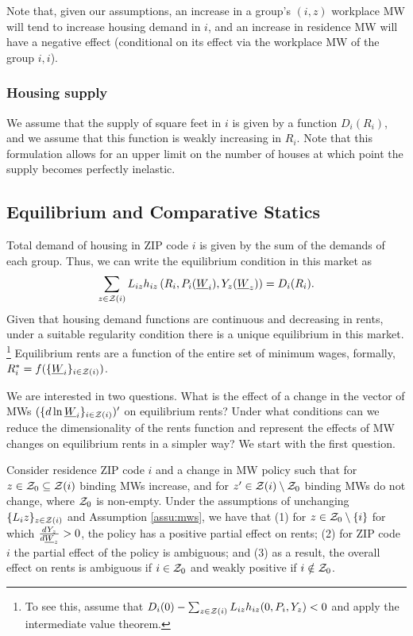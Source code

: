 Note that, given our assumptions, an increase in a group's $(i,z)$ workplace MW 
will tend to increase housing demand in $i$, and an increase in residence MW
will have a negative effect (conditional on its effect via the workplace MW
of the group $i,i$).


\subsubsection*{Housing supply}

We assume that the supply of square feet in $i$ is given by a function $D_i(R_i)$,
and we assume that this function is weakly increasing in $R_i$.
Note that this formulation allows for an upper limit on the number of houses at 
which point the supply becomes perfectly inelastic.

\subsection{Equilibrium and Comparative Statics}

Total demand of housing in ZIP code $i$ is given by the sum of the demands of 
each group.
Thus, we can write the equilibrium condition in this market as
\begin{equation}\label{eq:equilibrium}
	\sum_{z\in\mathcal{Z}(i)} L_{iz} h_{iz} \left(R_i, P_i(\underline{W}_i), Y_z(\underline{W}_z)\right) = D_i(R_i) .
\end{equation}
Given that housing demand functions are continuous and decreasing in rents, 
under a suitable regularity condition there is a unique equilibrium in this market.%
\footnote{To see this, assume that 
$D_i(0) - \sum_{z\in\mathcal{Z}(i)} L_{iz} h_{iz} (0, P_i, Y_z) < 0$
and apply the intermediate value theorem.}
Equilibrium rents are a function of the entire set of minimum wages, formally, 
$R^*_i = f(\{\underline{W}_i\}_{i\in\mathcal{Z}(i)})$.

We are interested in two questions.
What is the effect of a change in the vector of MWs $(\{d \ln \underline{W}_i\}_{i\in\mathcal{Z}(i)})'$
on equilibrium rents?
Under what conditions can we reduce the dimensionality of the rents function and 
represent the effects of MW changes on equilibrium rents in a simpler way?
We start with the first question.

\begin{prop}\label{prop:comparative_statics}
    Consider residence ZIP code $i$ and a change in MW policy such that 
    for $z\in\mathcal{Z}_0 \subseteq \mathcal{Z}(i)$ binding MWs increase, 
    and for $z'\in\mathcal{Z}(i)\setminus \mathcal{Z}_0$ binding MWs do not change,
    where $\mathcal{Z}_0$ is non-empty.
    Under the assumptions of unchanging $\{L_iz\}_{z\in\mathcal{Z}(i)}$ 
    and Assumption \ref{assu:mws},
    we have that
    (1) for $z\in\mathcal{Z}_0\setminus\{i\}$ for which $\frac{d Y_z}{d \underline{W}_z}>0$, 
    the policy has a positive partial effect on rents;
    (2) for ZIP code $i$ the partial effect of the policy is ambiguous; and
    (3) as a result, the overall effect on rents is ambiguous if $i\in\mathcal{Z}_0$ 
    and weakly positive if $i\notin\mathcal{Z}_0$.
\end{prop}

